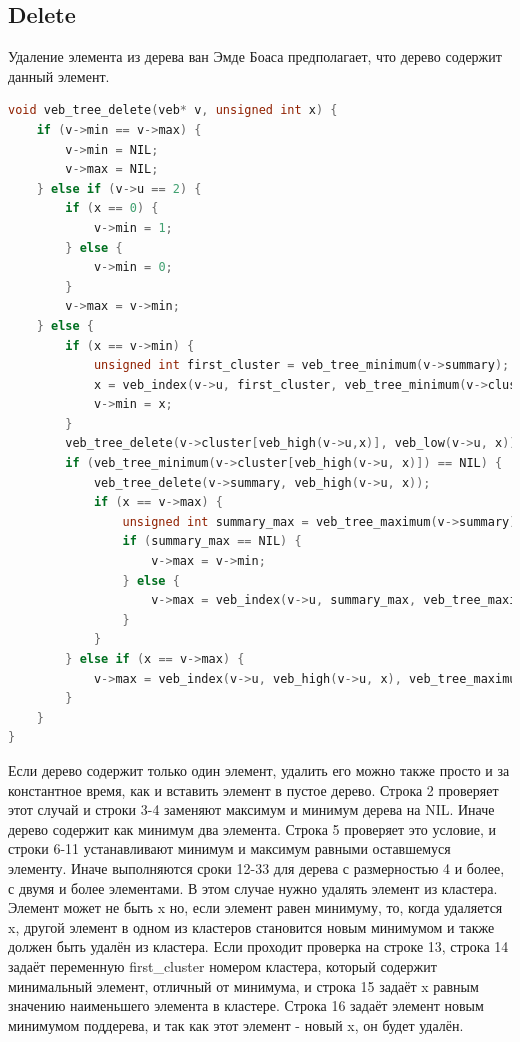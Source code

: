 \documentclass{article}
\begin{document}
\subsection{Delete}
Удаление элемента из дерева ван Эмде Боаса предполагает, что дерево содержит данный элемент.
\begin{lstlisting}[language=C,style=C]
void veb_tree_delete(veb* v, unsigned int x) {
    if (v->min == v->max) {
        v->min = NIL;
        v->max = NIL;
    } else if (v->u == 2) {
        if (x == 0) {
            v->min = 1;
        } else {
            v->min = 0;
        }
        v->max = v->min;
    } else {
        if (x == v->min) {
            unsigned int first_cluster = veb_tree_minimum(v->summary);
            x = veb_index(v->u, first_cluster, veb_tree_minimum(v->cluster[first_cluster]));
            v->min = x;
        }
        veb_tree_delete(v->cluster[veb_high(v->u,x)], veb_low(v->u, x));   
        if (veb_tree_minimum(v->cluster[veb_high(v->u, x)]) == NIL) {
            veb_tree_delete(v->summary, veb_high(v->u, x));
            if (x == v->max) {
                unsigned int summary_max = veb_tree_maximum(v->summary);
                if (summary_max == NIL) {
                    v->max = v->min;
                } else {
                    v->max = veb_index(v->u, summary_max, veb_tree_maximum(v->cluster[summary_max]));
                }       
            }
        } else if (x == v->max) {
            v->max = veb_index(v->u, veb_high(v->u, x), veb_tree_maximum(v->cluster[veb_high(v->u, x)]));
        }
    }
}
\end{lstlisting}
Если дерево содержит только один элемент, удалить его можно также просто и за константное время, как и вставить элемент в пустое дерево. Строка 2 проверяет этот случай и строки 3-4 заменяют максимум и минимум дерева на NIL. Иначе дерево содержит как минимум два элемента. Строка 5 проверяет это условие, и строки 6-11 устанавливают минимум и максимум равными оставшемуся элементу.
Иначе выполняются сроки 12-33 для дерева с размерностью 4 и более, с двумя и более элементами. В этом случае нужно удалять элемент из кластера. Элемент может не быть x но, если элемент равен минимуму, то, когда удаляется x, другой элемент в одном из кластеров становится новым минимумом и также должен быть удалён из кластера. Если проходит проверка на строке 13, строка 14 задаёт переменную first\_cluster номером кластера, который содержит минимальный элемент, отличный от минимума, и строка 15 задаёт x равным значению наименьшего элемента в кластере. Строка 16 задаёт элемент новым минимумом поддерева, и так как этот элемент - новый x, он будет удалён.
\end{document}
